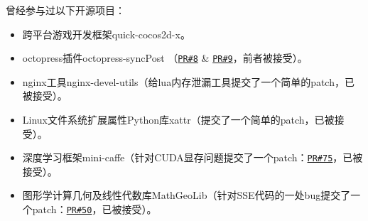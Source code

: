 \documentclass[letterpaper]{article}
\begin{document}
\begin{itemize}
\end{itemize}

曾经参与过以下开源项目：
\begin{itemize}
  \item 跨平台游戏开发框架quick-cocos2d-x。
  \item octopress插件octopress-syncPost （\href{https://github.com/huangbowen521/octopress-syncPost/pull/8}{\tt PR\#8} \& \href{https://github.com/huangbowen521/octopress-syncPost/pull/9}{\tt PR\#9}，前者被接受）。
  \item nginx工具nginx-devel-utils（给lua内存泄漏工具提交了一个简单的patch，已被接受）。
  \item Linux文件系统扩展属性Python库xattr（提交了一个简单的patch，已被接受）。
  \item 深度学习框架mini-caffe（针对CUDA显存问题提交了一个patch：\href{https://github.com/luoyetx/mini-caffe/pull/75}{\tt PR\#75}，已被接受）。
  \item 图形学计算几何及线性代数库MathGeoLib（针对SSE代码的一处bug提交了一个patch：\href{https://github.com/juj/MathGeoLib/pull/50}{\tt PR\#50}，已被接受）。
\end{itemize}
\end{document}
